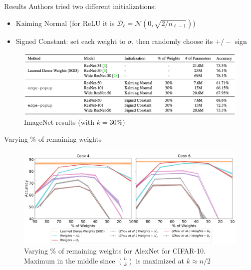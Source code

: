 \documentclass[10pt]{beamer}
\begin{document}
\begin{frame}{Results}
    \pause
    Authors tried two different initializations:
    \begin{itemize}
        \item\pause Kaiming Normal (for ReLU it is $\mathcal{D}_{\ell}=\mathcal{N}(0, \sqrt{2 / n_{\ell-1}})$)
        \item\pause Signed Constant: set each weight to $\sigma$, then randomly choose its $+/-$ sign
    \end{itemize}
    
    \begin{figure}
        \centering
        \includegraphics[width=\textwidth]{images/imagenet-results}
        \caption{ImageNet results (with $k=30\%$)}
    \end{figure}
\end{frame}

\begin{frame}{Varying \% of remaining weights}
    \begin{figure}
        \centering
        \includegraphics[width=\textwidth]{images/varying-k}
        \caption{Varying \% of remaining weights for AlexNet for CIFAR-10. Maximum in the middle since $\binom{n}{k}$ is maximized at $k \approx n/2$}
    \end{figure}
\end{frame}
\end{document}
